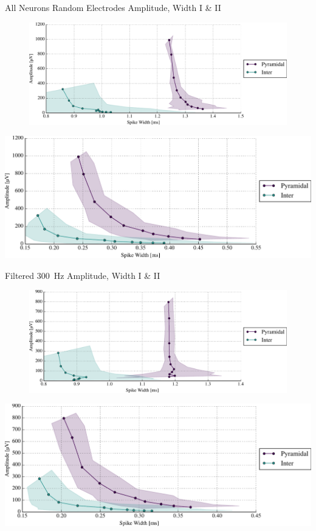 \documentclass{beamer}
\begin{document}
\begin{frame}{All Neurons Random Electrodes Amplitude, Width I \& II}{}
    \centering
    \begin{figure}
    \includegraphics[height=0.4\textheight]{images/amps_widths_I_all.pdf}\\
    \end{figure}
    \includegraphics[height=0.4\textheight]{images/amps_widths_II_all.pdf}
\end{frame}

\begin{frame}{Filtered \SI{300}{\hertz} Amplitude, Width I \& II}{}
    \centering
    \begin{figure}
    \includegraphics[height=0.4\textheight]{images/filt300_amps_widths_I_all.pdf}\\
    \end{figure}
    \includegraphics[height=0.4\textheight]{images/filt300_amps_widths_II_all.pdf}
\end{frame}
\end{document}
